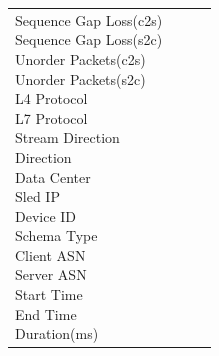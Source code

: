 \begin{description}
\begin{longtable}{p{}|p{}|p{}|p{}}
{                                                                                                    Sequence Gap Loss(c2s)\\
                                                                                                    Sequence Gap Loss(s2c)\\
                                                                                                    Unorder Packets(c2s)\\
                                                                                                    Unorder Packets(s2c)\\
                                                                                                    L4 Protocol\\
                                                                                                    L7 Protocol\\
                                                                                                    Stream Direction\\
                                                                                                    Direction\\
                                                                                                    Data Center\\
                                                                                                    Sled IP\\
                                                                                                    Device ID\\
                                                                                                    Schema Type\\
                                                                                                    Client ASN\\
                                                                                                    Server ASN\\
                                                                                                    Start Time\\
                                                                                                    End Time\\
                                                                                                    Duration(ms)\\
}
\end{longtable}
\end{description}

